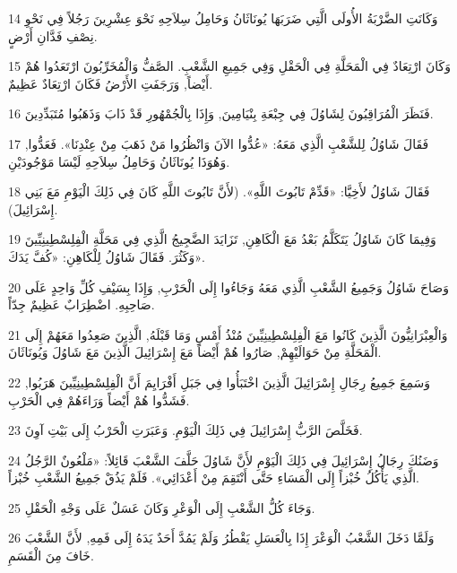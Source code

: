 \par 14 وَكَانَتِ الضَّرْبَةُ الأُولَى الَّتِي ضَرَبَهَا يُونَاثَانُ وَحَامِلُ سِلاَحِهِ نَحْوَ عِشْرِينَ رَجُلاً فِي نَحْوِ نِصْفِ فَدَّانِ أَرْضٍ.
\par 15 وَكَانَ ارْتِعَادٌ فِي الْمَحَلَّةِ فِي الْحَقْلِ وَفِي جَمِيعِ الشَّعْبِ. الصَّفُّ وَالْمُخَرِّبُونَ ارْتَعَدُوا هُمْ أَيْضاً, وَرَجَفَتِ الأَرْضُ فَكَانَ ارْتِعَادٌ عَظِيمٌ.
\par 16 فَنَظَرَ الْمُرَاقِبُونَ لِشَاوُلَ فِي جِبْعَةِ بِنْيَامِينَ, وَإِذَا بِالْجُمْهُورِ قَدْ ذَابَ وَذَهَبُوا مُتَبَدِّدِينَ.
\par 17 فَقَالَ شَاوُلُ لِلشَّعْبِ الَّذِي مَعَهُ: «عُدُّوا الآنَ وَانْظُرُوا مَنْ ذَهَبَ مِنْ عِنْدِنَا». فَعَدُّوا, وَهُوَذَا يُونَاثَانُ وَحَامِلُ سِلاَحِهِ لَيْسَا مَوْجُودَيْنِ.
\par 18 فَقَالَ شَاوُلُ لأَخِيَّا: «قَدِّمْ تَابُوتَ اللَّهِ». (لأَنَّ تَابُوتَ اللَّهِ كَانَ فِي ذَلِكَ الْيَوْمِ مَعَ بَنِي إِسْرَائِيلَ).
\par 19 وَفِيمَا كَانَ شَاوُلُ يَتَكَلَّمُ بَعْدُ مَعَ الْكَاهِنِ, تَزَايَدَ الضَّجِيجُ الَّذِي فِي مَحَلَّةِ الْفِلِسْطِينِيِّينَ وَكَثُرَ. فَقَالَ شَاوُلُ لِلْكَاهِنِ: «كُفَّ يَدَكَ».
\par 20 وَصَاحَ شَاوُلُ وَجَمِيعُ الشَّعْبِ الَّذِي مَعَهُ وَجَاءُوا إِلَى الْحَرْبِ, وَإِذَا بِسَيْفِ كُلِّ وَاحِدٍ عَلَى صَاحِبِهِ. اضْطِرَابٌ عَظِيمٌ جِدّاً.
\par 21 وَالْعِبْرَانِيُّونَ الَّذِينَ كَانُوا مَعَ الْفِلِسْطِينِيِّينَ مُنْذُ أَمْسِ وَمَا قَبْلَهُ, الَّذِينَ صَعِدُوا مَعَهُمْ إِلَى الْمَحَلَّةِ مِنْ حَوَالَيْهِمْ, صَارُوا هُمْ أَيْضاً مَعَ إِسْرَائِيلَ الَّذِينَ مَعَ شَاوُلَ وَيُونَاثَانَ.
\par 22 وَسَمِعَ جَمِيعُ رِجَالِ إِسْرَائِيلَ الَّذِينَ اخْتَبَأُوا فِي جَبَلِ أَفْرَايِمَ أَنَّ الْفِلِسْطِينِيِّينَ هَرَبُوا, فَشَدُّوا هُمْ أَيْضاً وَرَاءَهُمْ فِي الْحَرْبِ.
\par 23 فَخَلَّصَ الرَّبُّ إِسْرَائِيلَ فِي ذَلِكَ الْيَوْمِ. وَعَبَرَتِ الْحَرْبُ إِلَى بَيْتِ آوِنَ.
\par 24 وَضَنُكَ رِجَالُ إِسْرَائِيلَ فِي ذَلِكَ الْيَوْمِ لأَنَّ شَاوُلَ حَلَّفَ الشَّعْبَ قَائِلاً: «مَلْعُونٌ الرَّجُلُ الَّذِي يَأْكُلُ خُبْزاً إِلَى الْمَسَاءِ حَتَّى أَنْتَقِمَ مِنْ أَعْدَائِي». فَلَمْ يَذُقْ جَمِيعُ الشَّعْبِ خُبْزاً.
\par 25 وَجَاءَ كُلُّ الشَّعْبِ إِلَى الْوَعْرِ وَكَانَ عَسَلٌ عَلَى وَجْهِ الْحَقْلِ.
\par 26 وَلَمَّا دَخَلَ الشَّعْبُ الْوَعْرَ إِذَا بِالْعَسَلِ يَقْطُرُ وَلَمْ يَمُدَّ أَحَدٌ يَدَهُ إِلَى فَمِهِ, لأَنَّ الشَّعْبَ خَافَ مِنَ الْقَسَمِ.
